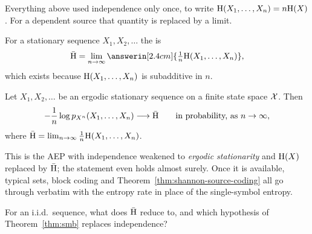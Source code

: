 
Everything above used independence only once, to write
$\mathrm{H}(X_1,\ldots,X_n)=n\mathrm{H}(X)$. For a dependent source that quantity is
replaced by a limit.

\begin{definition}\label{def:entropy-rate}
For a stationary sequence $X_1,X_2,\ldots$ the  is
\[
  \bar\Ent=\lim_{n\to\infty}\answerin[2.4cm]{\tfrac1n\Ent(X_1,\ldots,X_n)},
\]
which exists because $\mathrm{H}(X_1,\ldots,X_n)$ is subadditive in $n$.
\end{definition}

\begin{theorem}\label{thm:smb}
Let $X_1,X_2,\ldots$ be an ergodic stationary sequence on a finite state space
$\mathcal{X}$. Then
\[
  -\frac1n\log p_{X^n}(X_1,\ldots,X_n)
  \longrightarrow\bar{\mathrm{H}}
  \qquad\text{in probability, as }n\to\infty,
\]
where $\bar{\mathrm{H}}=\lim_{n\to\infty}\frac1n\mathrm{H}(X_1,\ldots,X_n)$.
\end{theorem}

This is the AEP with independence weakened to \emph{ergodic stationarity} and
$\mathrm{H}(X)$ replaced by $\bar{\mathrm{H}}$; the statement even holds almost surely. Once
it is available, typical sets, block coding and
Theorem~\ref{thm:shannon-source-coding} all go through verbatim with the
entropy rate in place of the single-symbol entropy.

\begin{yourturn}
For an i.i.d.\ sequence, what does $\bar{\mathrm{H}}$ reduce to, and which hypothesis of
Theorem~\ref{thm:smb} replaces independence?
\ifshowanswers\else\workspace[2]\fi
{}
\end{yourturn}

\vspace{0.8cm}

